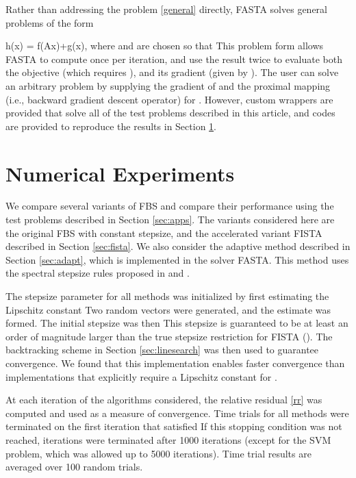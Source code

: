 \documentclass{amsart}
\newcommand{\eqb}[1]{}
\DeclareMathOperator*{\minimize}{minimize\quad}
\theoremstyle{definition}
\begin{document}
Rather than addressing the problem \eqref{general} directly, FASTA solves general problems of the form
\eqb{general_fasta}
\minimize h(x) =  \tilde f(Ax)+g(x),
\eqe 
where  and  are chosen so that   This problem form allows FASTA to compute  once per iteration, and use the result twice to evaluate both the objective (which requires ), and its gradient (given by ). The user can solve an arbitrary problem by supplying  the gradient of  and the proximal mapping (i.e., backward gradient descent operator) for .  However, custom wrappers are provided that solve all of the test problems described in this article, and codes are provided to reproduce the results in Section \ref{sec:num}.


\section{Numerical Experiments} \label{sec:num}

We compare several variants of FBS and compare their performance using the test problems described in Section \ref{sec:apps}.  The variants considered here are the original FBS with constant stepsize, and the accelerated variant FISTA described in Section \ref{sec:fista}.  We also consider the adaptive method described in Section \ref{sec:adapt}, which is implemented in the solver FASTA.  This method uses the spectral stepsize rules proposed in \cite{WNF09} and \cite{ZGD06}.

The stepsize parameter for all methods was initialized by first estimating the Lipschitz constant  Two random vectors  were generated, and the estimate  was formed. The initial stepsize was then   This stepsize is guaranteed to be at least an order of magnitude larger than the true stepsize restriction for FISTA ().  The backtracking scheme in Section \ref{sec:linesearch} was then used to guarantee convergence.  We found that this implementation enables faster convergence than implementations that explicitly require a Lipschitz constant for .

 At each iteration of the algorithms considered, the relative residual \eqref{rr} was computed and used as a measure of convergence.  Time trials for all methods were terminated on the first iteration that satisfied  If this stopping condition was not reached, iterations were terminated after 1000 iterations (except for the SVM problem, which was allowed up to 5000 iterations).  Time trial results are averaged over 100 random trials.
 
\end{document}
